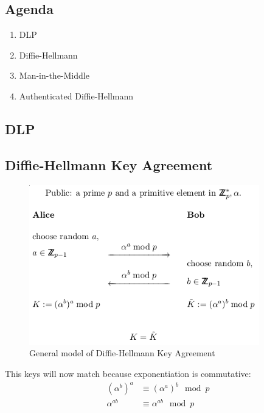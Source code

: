 

\subsection*{Agenda}
\begin{enumerate}
\item DLP
\item Diffie-Hellmann
\item Man-in-the-Middle
\item Authenticated Diffie-Hellmann
\end{enumerate}

\subsection{DLP}


\subsection{Diffie-Hellmann Key Agreement}
\begin{figure}[H]
  \begin{centering}
    \includegraphics[width=10cm]{images/11-diffie}
    \caption{General model of Diffie-Hellmann Key Agreement}
  \end{centering}
  \label{fig:diffie}
\end{figure}

This keys will now match because exponentiation is commutative:
\begin{align*}
  (\alpha^b)^a &\equiv (\alpha^a)^b \mod p \\
  \alpha^{ab} &\equiv \alpha^{ab} \mod p
\end{align*}

